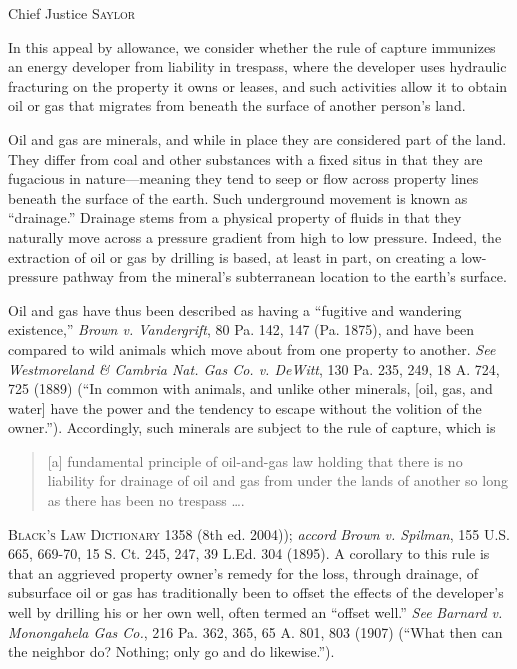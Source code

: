 

\opinion Chief Justice \textsc{Saylor}

In this appeal by allowance, we consider whether the rule of capture immunizes
an energy developer from liability in trespass, where the developer uses
hydraulic fracturing on the property it owns or leases, and such activities
allow it to obtain oil or gas that migrates from beneath the surface of another
person's land.


Oil and gas are minerals, and while in place they are considered part of the
land. They differ from coal and other substances with a fixed situs in that they
are fugacious in nature---meaning they tend to seep or flow across property
lines beneath the surface of the earth. Such underground movement is known as
``drainage.'' Drainage stems from a physical property of fluids in that they
naturally move across a pressure gradient from high to low pressure. Indeed, the
extraction of oil or gas by drilling is based, at least in part, on creating a
low-pressure pathway from the mineral's subterranean location to the earth's
surface.

Oil and gas have thus been described as having a ``fugitive and wandering
existence,'' \textit{Brown v. Vandergrift}, 80 Pa. 142, 147 (Pa. 1875), and have
been compared to wild animals which move about from one property to another.
\textit{See} \textit{Westmoreland \& Cambria Nat. Gas Co. v. DeWitt}, 130 Pa.
235, 249, 18 A. 724, 725 (1889) (``In common with animals, and unlike other
minerals, [oil, gas, and water] have the power and the tendency to escape
without the volition of the owner.''). Accordingly, such minerals are subject to
the rule of capture, which is
\begin{quote}
[a] fundamental principle of oil-and-gas law holding that there is no liability
for drainage of oil and gas from under the lands of another so long as there has
been no trespass \ldots.
\end{quote}
\textsc{Black's Law Dictionary} 1358 (8th ed. 2004)); \textit{accord}
\textit{Brown v. Spilman}, 155 U.S. 665, 669-70, 15 S. Ct. 245, 247, 39 L.Ed.
304 (1895). A corollary to this rule is that an
aggrieved property owner's remedy for the loss, through drainage, of subsurface
oil or gas has traditionally been to offset the effects of the developer's well
by drilling his or her own well, often termed an ``offset well.'' \textit{See}
\textit{Barnard v. Monongahela Gas Co.}, 216 Pa. 362, 365, 65 A. 801, 803 (1907)
(``What then can the neighbor do? Nothing; only go and do likewise.'').

